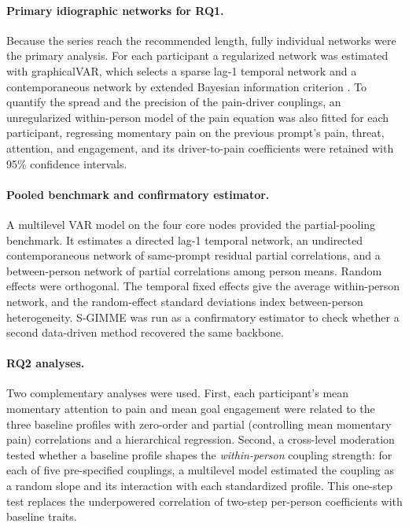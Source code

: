 \documentclass[11pt,a4paper]{article}
\begin{document}
\paragraph{Primary idiographic networks for RQ1.} Because the series reach the recommended
length, fully individual networks were the primary analysis. For each participant a regularized
network was estimated with graphicalVAR, which selects a sparse lag-1 temporal network and a
contemporaneous network by extended Bayesian information criterion \citep{epskamp2018tutorial}.
To quantify the spread and the precision of the pain-driver couplings, an unregularized
within-person model of the pain equation was also fitted for each participant, regressing
momentary pain on the previous prompt's pain, threat, attention, and engagement, and its
driver-to-pain coefficients were retained with 95\% confidence intervals.

\paragraph{Pooled benchmark and confirmatory estimator.} A multilevel VAR model
\citep{epskamp2018gaussian} on the four core nodes provided the partial-pooling benchmark. It
estimates a directed lag-1 temporal network, an undirected contemporaneous network of same-prompt
residual partial correlations, and a between-person network of partial correlations among person
means. Random effects were orthogonal. The temporal fixed effects give the average within-person
network, and the random-effect standard deviations index between-person heterogeneity. S-GIMME
\citep{lane2019uncovering} was run as a confirmatory estimator to check whether a second
data-driven method recovered the same backbone.

\paragraph{RQ2 analyses.} Two complementary analyses were used. First, each participant's mean
momentary attention to pain and mean goal engagement were related to the three baseline profiles
with zero-order and partial (controlling
mean momentary pain) correlations and a hierarchical regression. Second, a cross-level moderation
tested whether a baseline profile shapes the \emph{within-person} coupling strength: for each of
five pre-specified couplings, a multilevel model estimated the coupling as a random slope and its
interaction with each standardized profile. This one-step test replaces the underpowered
correlation of two-step per-person coefficients with baseline traits.
\end{document}
